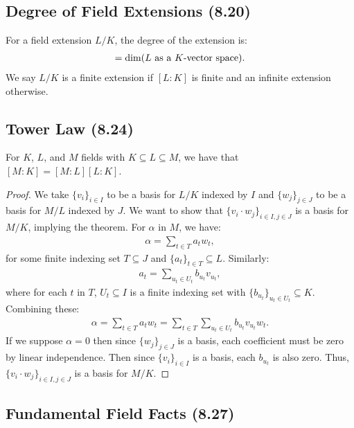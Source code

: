 \subsection{Degree of Field Extensions (8.20)} \label{8.20}

For a field extension $L / K$, the degree of the extension is: \begin{align*}
    [L : K] = \Dim(L \text{ as a $K$-vector space}).
\end{align*} We say $L / K$ is a finite extension if $[L : K]$ is finite
and an infinite extension otherwise.

\subsection{Tower Law (8.24)} \label{8.24}

For $K$, $L$, and $M$ fields with $K \subseteq L \subseteq M$, we have
that $[M : K] = [M : L][L : K]$.

\begin{proof}
    We take $\{v_i\}_{i \in I}$ to be a basis for $L / K$ indexed by $I$
    and $\{w_j\}_{j \in J}$ to be a basis for $M / L$ indexed by $J$.
    We want to show that $\{v_i \cdot w_j\}_{i \in I, j \in J}$ is a
    basis for $M / K$, implying the theorem. For $\alpha$ in $M$,
    we have: \begin{align*}
        \alpha = \sum_{t \in T} a_tw_t,
    \end{align*} for some finite indexing set $T \subseteq J$ and 
    $\{a_t\}_{t \in T} \subseteq L$. Similarly: \begin{align*}
        a_t = \sum_{u_t \in U_t} b_{u_t}v_{u_t},
    \end{align*} where for each $t$ in $T$, $U_t \subseteq I$ is a finite indexing
    set with $\{b_{u_t}\}_{u_t \in U_t} \subseteq K$. Combining these: \begin{align*}
        \alpha = \sum_{t \in T} a_tw_t = \sum_{t \in T} \sum_{u_t \in U_t} b_{u_t}v_{u_t}w_t.
    \end{align*} If we suppose $\alpha = 0$ then since $\{w_j\}_{j \in J}$ is a basis,
    each coefficient must be zero by linear independence. Then since $\{v_i\}_{i \in I}$
    is a basis, each $b_{u_t}$ is also zero. Thus, $\{v_i \cdot w_j\}_{i \in I, j \in J}$ is a
    basis for $M / K$.
\end{proof}

\subsection{Fundamental Field Facts (8.27)} \label{8.27}

